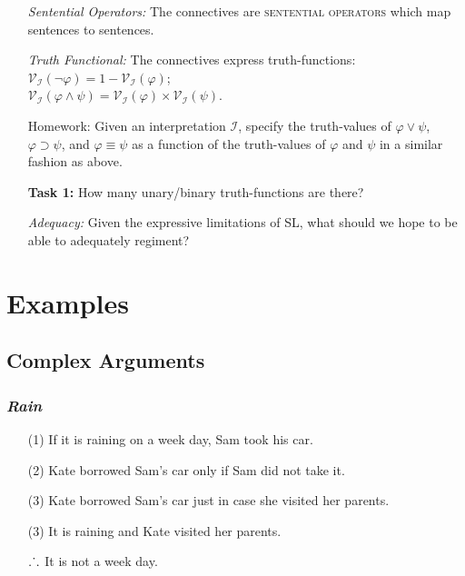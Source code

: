 \documentclass[a4paper, 11pt]{article} %
\def\therefore{\ensuremath{\ldotp\dot{}\,\ldotp}}
\newcommand{\I}{\mathcal{I}}
\newcommand{\V}[1]{\mathcal{V}_{#1}} %
\begin{document}
\begin{enumerate}[leftmargin=1.5in,labelsep=.15in] %
  \item[\it Sentential Operators:] The connectives are \textsc{sentential operators} which map sentences to sentences.
  \item[\it Truth Functional:] The connectives express truth-functions:\\ 
    $\V{\I}(\neg\varphi)=1-\V{\I}(\varphi)$;\\
    $\V{\I}(\varphi\wedge\psi)=\V{\I}(\varphi)\times\V{\I}(\psi)$.
  \item[\sc Homework:] Given an interpretation $\I$, specify the truth-values of $\varphi\vee\psi$, $\varphi\supset\psi$, and $\varphi\equiv\psi$ as a function of the truth-values of $\varphi$ and $\psi$ in a similar fashion as above.
  \item[\bf Task 1:] How many unary/binary truth-functions are there?
  \item[\it Adequacy:] Given the expressive limitations of SL, what should we hope to be able to adequately regiment?
\end{enumerate}





\section*{Examples}

\subsection*{\sc Complex Arguments}

\subsubsection*{\it \textbf{Rain}}

\begin{enumerate}
  \item[(1)] If it is raining on a week day, Sam took his car.
  \item[(2)] Kate borrowed Sam's car only if Sam did not take it.
  \item[(3)] Kate borrowed Sam's car just in case she visited her parents.
  \item[(3)] It is raining and Kate visited her parents.
  \item[\therefore] It is not a week day.
\end{enumerate}
\end{document}
